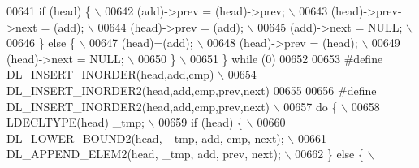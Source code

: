 \begin{DoxyCode}
00641 \textcolor{preprocessor}{  if (head) \{                                                                                  \(\backslash\)}
00642 \textcolor{preprocessor}{      (add)->prev = (head)->prev;                                                              \(\backslash\)}
00643 \textcolor{preprocessor}{      (head)->prev->next = (add);                                                              \(\backslash\)}
00644 \textcolor{preprocessor}{      (head)->prev = (add);                                                                    \(\backslash\)}
00645 \textcolor{preprocessor}{      (add)->next = NULL;                                                                      \(\backslash\)}
00646 \textcolor{preprocessor}{  \} else \{                                                                                     \(\backslash\)}
00647 \textcolor{preprocessor}{      (head)=(add);                                                                            \(\backslash\)}
00648 \textcolor{preprocessor}{      (head)->prev = (head);                                                                   \(\backslash\)}
00649 \textcolor{preprocessor}{      (head)->next = NULL;                                                                     \(\backslash\)}
00650 \textcolor{preprocessor}{  \}                                                                                            \(\backslash\)}
00651 \textcolor{preprocessor}{\} while (0)}
00652 
00653 \textcolor{preprocessor}{#define DL\_INSERT\_INORDER(head,add,cmp)                                                        \(\backslash\)}
00654 \textcolor{preprocessor}{    DL\_INSERT\_INORDER2(head,add,cmp,prev,next)}
00655 
00656 \textcolor{preprocessor}{#define DL\_INSERT\_INORDER2(head,add,cmp,prev,next)                                             \(\backslash\)}
00657 \textcolor{preprocessor}{do \{                                                                                           \(\backslash\)}
00658 \textcolor{preprocessor}{  LDECLTYPE(head) \_tmp;                                                                        \(\backslash\)}
00659 \textcolor{preprocessor}{  if (head) \{                                                                                  \(\backslash\)}
00660 \textcolor{preprocessor}{    DL\_LOWER\_BOUND2(head, \_tmp, add, cmp, next);                                               \(\backslash\)}
00661 \textcolor{preprocessor}{    DL\_APPEND\_ELEM2(head, \_tmp, add, prev, next);                                              \(\backslash\)}
00662 \textcolor{preprocessor}{  \} else \{                                                                                     \(\backslash\)}

\end{DoxyCode}
